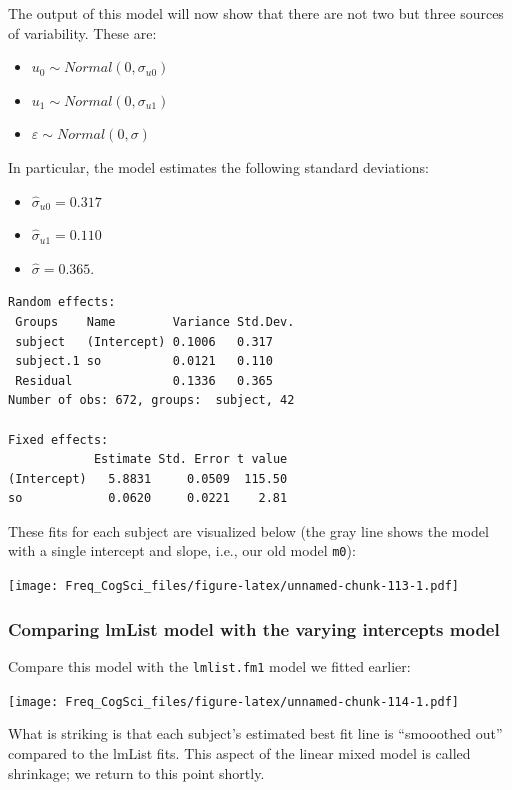 \documentclass[12pt,]{krantz}
\providecommand{\tightlist}{%
  \setlength{\itemsep}{0pt}\setlength{\parskip}{0pt}}
\begin{document}
The output of this model will now show that there are not two but three sources of variability. These are:

\begin{itemize}
\tightlist
\item
  \(u_0 \sim Normal(0,\sigma_{u0})\)
\item
  \(u_1 \sim Normal(0,\sigma_{u1})\)
\item
  \(\varepsilon \sim Normal(0,\sigma)\)
\end{itemize}

In particular, the model estimates the following standard deviations:

\begin{itemize}
\tightlist
\item
  \(\hat\sigma_{u0}=0.317\)
\item
  \(\hat\sigma_{u1}=0.110\)
\item
  \(\hat\sigma = 0.365\).
\end{itemize}

\begin{verbatim}
Random effects:
 Groups    Name        Variance Std.Dev.
 subject   (Intercept) 0.1006   0.317   
 subject.1 so          0.0121   0.110   
 Residual              0.1336   0.365   
Number of obs: 672, groups:  subject, 42

Fixed effects:
            Estimate Std. Error t value
(Intercept)   5.8831     0.0509  115.50
so            0.0620     0.0221    2.81
\end{verbatim}

These fits for each subject are visualized below (the gray line shows the model with a single intercept and slope, i.e., our old model \texttt{m0}):

\texttt{[image: Freq\_CogSci\_files/figure-latex/unnamed-chunk-113-1.pdf]}

\hypertarget{comparing-lmlist-model-with-the-varying-intercepts-model}{%
\subsubsection{Comparing lmList model with the varying intercepts model}\label{comparing-lmlist-model-with-the-varying-intercepts-model}}

Compare this model with the \texttt{lmlist.fm1} model we fitted earlier:

\texttt{[image: Freq\_CogSci\_files/figure-latex/unnamed-chunk-114-1.pdf]}

What is striking is that each subject's estimated best fit line is ``smooothed out'' compared to the lmList fits. This aspect of the linear mixed model is called shrinkage; we return to this point shortly.
\end{document}
